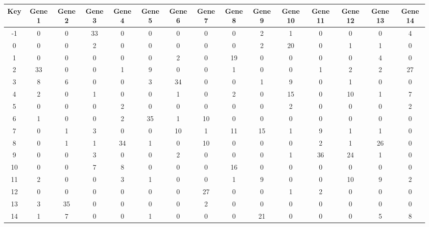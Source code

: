 \begin{tabular}{|c|c|c|c|c|c|c|c|c|c|c|c|c|c|c|}
\hline
Key & Gene 1 & Gene 2 & Gene 3 & Gene 4 & Gene 5 & Gene 6 & Gene 7 & Gene 8 & Gene 9 & Gene 10 & Gene 11 & Gene 12 & Gene 13 & Gene 14 \\
\hline
-1 & 0 & 0 & 33 & 0 & 0 & 0 & 0 & 0 & 2 & 1 & 0 & 0 & 0 & 4 \\
0 & 0 & 0 & 2 & 0 & 0 & 0 & 0 & 0 & 2 & 20 & 0 & 1 & 1 & 0 \\
1 & 0 & 0 & 0 & 0 & 0 & 2 & 0 & 19 & 0 & 0 & 0 & 0 & 4 & 0 \\
2 & 33 & 0 & 0 & 1 & 9 & 0 & 0 & 1 & 0 & 0 & 1 & 2 & 2 & 27 \\
3 & 8 & 6 & 0 & 0 & 3 & 34 & 0 & 0 & 1 & 9 & 0 & 1 & 0 & 0 \\
4 & 2 & 0 & 1 & 0 & 0 & 1 & 0 & 2 & 0 & 15 & 0 & 10 & 1 & 7 \\
5 & 0 & 0 & 0 & 2 & 0 & 0 & 0 & 0 & 0 & 2 & 0 & 0 & 0 & 2 \\
6 & 1 & 0 & 0 & 2 & 35 & 1 & 10 & 0 & 0 & 0 & 0 & 0 & 0 & 0 \\
7 & 0 & 1 & 3 & 0 & 0 & 10 & 1 & 11 & 15 & 1 & 9 & 1 & 1 & 0 \\
8 & 0 & 1 & 1 & 34 & 1 & 0 & 10 & 0 & 0 & 0 & 2 & 1 & 26 & 0 \\
9 & 0 & 0 & 3 & 0 & 0 & 2 & 0 & 0 & 0 & 1 & 36 & 24 & 1 & 0 \\
10 & 0 & 0 & 7 & 8 & 0 & 0 & 0 & 16 & 0 & 0 & 0 & 0 & 0 & 0 \\
11 & 2 & 0 & 0 & 3 & 1 & 0 & 0 & 1 & 9 & 0 & 0 & 10 & 9 & 2 \\
12 & 0 & 0 & 0 & 0 & 0 & 0 & 27 & 0 & 0 & 1 & 2 & 0 & 0 & 0 \\
13 & 3 & 35 & 0 & 0 & 0 & 0 & 2 & 0 & 0 & 0 & 0 & 0 & 0 & 0 \\
14 & 1 & 7 & 0 & 0 & 1 & 0 & 0 & 0 & 21 & 0 & 0 & 0 & 5 & 8 \\
\hline
\end{tabular}
